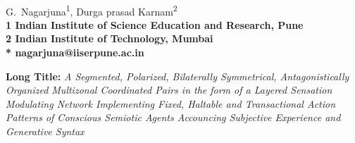 \documentclass[10pt,letterpaper]{article}
\begin{document}
\vspace*{0.35in}

\begin{flushleft}
{\Large
\textbf{}
}
\newline
\\
G.~Nagarjuna\textsuperscript{1},
Durga prasad Karnam\textsuperscript{2}
\\
\bigskip
\bf{1} Indian Institute of Science Education and Research, Pune
\\
\bf{2} Indian Institute of Technology, Mumbai
\\
\bigskip
* nagarjuna@iiserpune.ac.in

\end{flushleft}
\noindent \textbf{Long Title:} \textit{A Segmented, Polarized,
  Bilaterally Symmetrical, Antagonistically Organized Multizonal
  Coordinated Pairs in the form of a Layered Sensation Modulating
  Network Implementing Fixed, Haltable and Transactional Action
  Patterns of Conscious Semiotic Agents Accouncing Subjective
  Experience and Generative Syntax}
\end{document}

